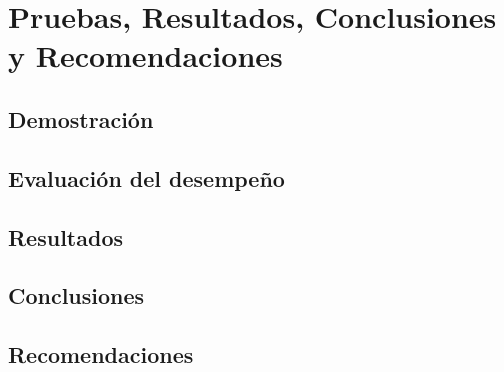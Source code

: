 \chapter{Pruebas, Resultados, Conclusiones y Recomendaciones}

\section{Demostración}

\section{Evaluación del desempeño}

\section{Resultados}

\section{Conclusiones}

\section{Recomendaciones}
